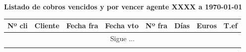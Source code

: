 \documentclass[a4paper]{article}
\begin{document}
\begin{center}
\textbf{Listado de cobros vencidos y por vencer agente XXXX a {\today}}
\small
\begin{longtable}{llcccrrr}
\toprule
\textbf{Nº cli} & \textbf{Cliente}&\textbf{Fecha fra}&\textbf{Fecha vto}&\textbf{Nº fra}&\textbf{Días}&\textbf{Euros}&\textbf{T.ef}\\
\toprule
\endhead
\multicolumn{8}{c}{Sigue $\ldots$}\\
\endfoot
\endlastfoot

\bottomrule
\end{longtable}
\end{center}
\end{document}
